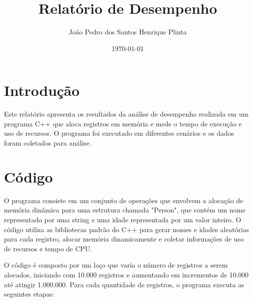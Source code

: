 \documentclass[a2paper,12pt]{article}
\begin{document}
\title{Relatório de Desempenho}
\author{João Pedro dos Santos Henrique Plinta}
\date{\today}
\maketitle

\section{Introdução}
Este relatório apresenta os resultados da análise de desempenho realizada em um programa C++ que aloca registros em memória e mede o tempo de execução e uso de recursos. O programa foi executado em diferentes cenários e os dados foram coletados para análise.

\section{Código}
O programa consiste em um conjunto de operações que envolvem a alocação de memória dinâmica para uma estrutura chamada "Person", que contém um nome representado por uma string e uma idade representada por um valor inteiro. O código utiliza as bibliotecas padrão do C++ para gerar nomes e idades aleatórias para cada registro, alocar memória dinamicamente e coletar informações de uso de recursos e tempo de CPU.

O código é composto por um laço que varia o número de registros a serem alocados, iniciando com 10.000 registros e aumentando em incrementos de 10.000 até atingir 1.000.000. Para cada quantidade de registros, o programa executa as seguintes etapas:
\end{document}
